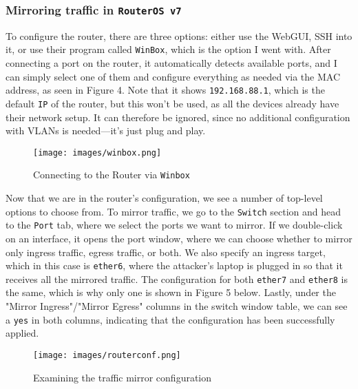\documentclass[a4paper]{article}
\newcommand{\abc}{\hfill \break}
\begin{document}
\subsubsection{Mirroring traffic in \texttt{RouterOS v7}}
To configure the router, there are three options: either use the WebGUI, SSH into it, or use their program called \texttt{WinBox}, which is the option I went with. After connecting a port on the router, it automatically detects available ports, and I can simply select one of them and configure everything as needed via the MAC address, as seen in Figure 4.\abc
Note that it shows \texttt{192.168.88.1}, which is the default \texttt{IP} of the router, but this won't be used, as all the devices already have their network setup. It can therefore be ignored, since no additional configuration with VLANs is needed—it's just plug and play.

\begin{figure}[!htbp]
	\texttt{[image: images/winbox.png]}
	\centering
	\caption{Connecting to the Router via \texttt{Winbox}}
\end{figure} \abc\newpage\abc
Now that we are in the router's configuration, we see a number of top-level options to choose from. To mirror traffic, we go to the \texttt{Switch} section and head to the \texttt{Port} tab, where we select the ports we want to mirror. If we double-click on an interface, it opens the port window, where we can choose whether to mirror only ingress traffic, egress traffic, or both.\abc
We also specify an ingress target, which in this case is \texttt{ether6}, where the attacker's laptop is plugged in so that it receives all the mirrored traffic. The configuration for both \texttt{ether7} and \texttt{ether8} is the same, which is why only one is shown in Figure 5 below. Lastly, under the "Mirror Ingress"/"Mirror Egress" columns in the switch window table, we can see a \texttt{yes} in both columns, indicating that the configuration has been successfully applied. \cite{mircotik-mirror}
\begin{figure}[!htbp]
	\texttt{[image: images/routerconf.png]}
	\centering
	\caption{Examining the traffic mirror configuration}
\end{figure} \abc\newpage
\end{document}

